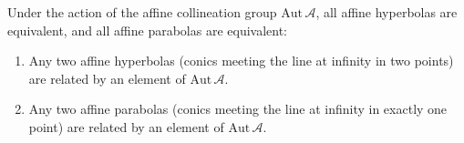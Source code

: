 Under the action of the affine collineation group $\text{Aut}\,\mathcal{A}$, all affine hyperbolas are equivalent, and all affine parabolas are equivalent:
\begin{enumerate}
\item[(i)] Any two affine hyperbolas (conics meeting the line at infinity in two points) are related by an element of $\text{Aut}\,\mathcal{A}$.
\item[(ii)] Any two affine parabolas (conics meeting the line at infinity in exactly one point) are related by an element of $\text{Aut}\,\mathcal{A}$.
\end{enumerate}
